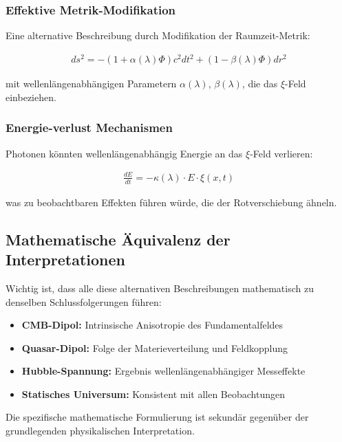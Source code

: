 \documentclass{article}
\begin{document}
	\subsubsection{Effektive Metrik-Modifikation}
	
	Eine alternative Beschreibung durch Modifikation der Raumzeit-Metrik:
	
	\begin{align}
		ds^2 = -\left(1 + \alpha(\lambda)\Phi\right)c^2dt^2 + \left(1 - \beta(\lambda)\Phi\right)dr^2
	\end{align}
	
	mit wellenlängenabhängigen Parametern $\alpha(\lambda)$, $\beta(\lambda)$, die das $\xi$-Feld einbeziehen.
	
	\subsubsection{Energie-verlust Mechanismen}
	
	Photonen könnten wellenlängenabhängig Energie an das $\xi$-Feld verlieren:
	
	\begin{align}
		\frac{dE}{dt} = -\kappa(\lambda) \cdot E \cdot \xi(x,t)
	\end{align}
	
	was zu beobachtbaren Effekten führen würde, die der Rotverschiebung ähneln.
	
	\subsection{Mathematische Äquivalenz der Interpretationen}
	
	Wichtig ist, dass alle diese alternativen Beschreibungen mathematisch zu denselben Schlussfolgerungen führen:
	
	\begin{itemize}
		\item \textbf{CMB-Dipol:} Intrinsische Anisotropie des Fundamentalfeldes
		\item \textbf{Quasar-Dipol:} Folge der Materieverteilung und Feldkopplung  
		\item \textbf{Hubble-Spannung:} Ergebnis wellenlängenabhängiger Messeffekte
		\item \textbf{Statisches Universum:} Konsistent mit allen Beobachtungen
	\end{itemize}
	
	Die spezifische mathematische Formulierung ist sekundär gegenüber der grundlegenden physikalischen Interpretation.
	
\end{document}
